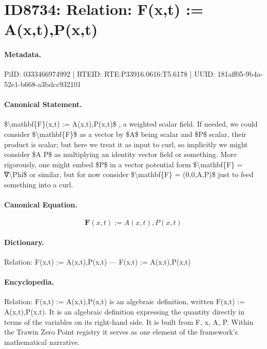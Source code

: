 \section*{ID8734: Relation: F(x,t) := A(x,t),P(x,t)}
\paragraph{Metadata.}
PiID: 0333466974992 | RTEID: RTE:P33916.0616:T5.6178 | UUID: 181aff05-9b4a-52e1-b668-a3bdcc932101

\paragraph{Canonical Statement.}
\$\textbackslash{}mathbf\{F\}(x,t) := A(x,t),P(x,t)\$ , a weighted scalar field. If needed, we could consider \$\textbackslash{}mathbf\{F\}\$ as a vector by \$A\$ being scalar and \$P\$ scalar, their product is scalar; but here we treat it as input to curl, so implicitly we might consider \$A P\$ as multiplying an identity vector field or something. More rigorously, one might embed \$P\$ in a vector potential form \$\textbackslash{}mathbf\{F\} = ∇\textbackslash{}Phi\$ or similar, but for now consider \$\textbackslash{}mathbf\{F\} = (0,0,A,P)\$ just to feed something into a curl.

\paragraph{Canonical Equation.}
\[
\mathbf{F}(x,t) := A(x,t),P(x,t)
\]

\paragraph{Dictionary.}
Relation: F(x,t) := A(x,t),P(x,t) — F(x,t) := A(x,t),P(x,t)

\paragraph{Encyclopedia.}
Relation: F(x,t) := A(x,t),P(x,t) is an algebraic definition, written F(x,t) := A(x,t),P(x,t). It is an algebraic definition expressing the quantity directly in terms of the variables on its right-hand side. It is built from F, x, A, P. Within the Trawin Zero Point registry it serves as one element of the framework's mathematical narrative.
